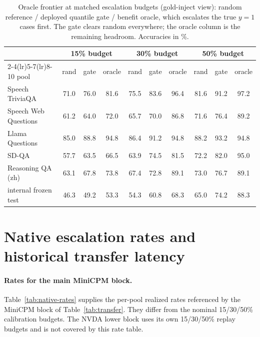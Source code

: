 \begin{table}[h]
\centering\footnotesize
\setlength{\tabcolsep}{4.5pt}
\caption{Oracle frontier at matched escalation budgets (gold-inject
view): random reference / deployed quantile gate / benefit oracle,
which escalates the true $y{=}1$ cases first. The gate clears random
everywhere; the oracle column is the remaining headroom. Accuracies
in \%.}
\label{tab:oracle}
\begin{tabular}{lccccccccc}
\toprule
& \multicolumn{3}{c}{15\% budget} & \multicolumn{3}{c}{30\% budget} & \multicolumn{3}{c}{50\% budget} \\
\cmidrule(lr){2-4}\cmidrule(lr){5-7}\cmidrule(lr){8-10}
pool & rand & gate & oracle & rand & gate & oracle & rand & gate & oracle \\
\midrule
Speech TriviaQA & 71.0 & 76.0 & 81.6 & 75.5 & 83.6 & 96.4 & 81.6 & 91.2 & 97.2 \\
Speech Web Questions & 61.2 & 64.0 & 72.0 & 65.7 & 70.0 & 86.8 & 71.6 & 76.4 & 89.2 \\
Llama Questions & 85.0 & 88.8 & 94.8 & 86.4 & 91.2 & 94.8 & 88.2 & 93.2 & 94.8 \\
SD-QA & 57.7 & 63.5 & 66.5 & 63.9 & 74.5 & 81.5 & 72.2 & 82.0 & 95.0 \\
Reasoning QA (zh) & 63.1 & 67.8 & 73.8 & 67.4 & 72.8 & 89.1 & 73.0 & 76.7 & 89.1 \\
\midrule
internal frozen test & 46.3 & 49.2 & 53.3 & 54.3 & 60.8 & 68.3 & 65.0 & 74.2 & 88.3 \\
\bottomrule
\end{tabular}
\end{table}

\section{Native escalation rates and historical transfer latency}
\label{app:transferdetail}

\paragraph{Rates for the main MiniCPM block.}
Table~\ref{tab:native-rates} supplies the per-pool realized rates
referenced by the MiniCPM block of Table~\ref{tab:transfer}. They differ
from the nominal 15/30/50\% calibration budgets. The NVDA lower
block uses its own 15/30/50\% replay budgets and is not covered by
this rate table.


